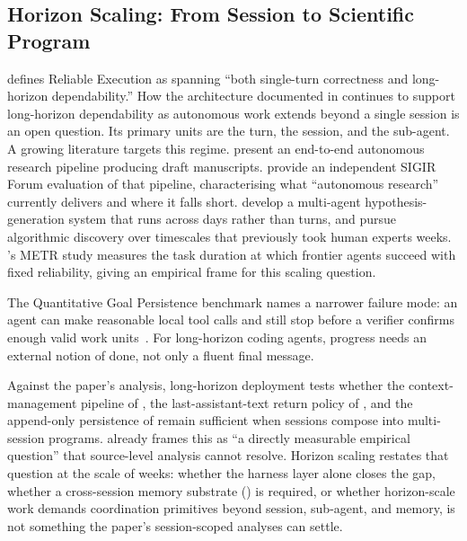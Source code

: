 \subsection{Horizon Scaling: From Session to Scientific Program}
\label{sec:future:horizon}

 defines Reliable Execution as spanning ``both single-turn correctness and long-horizon dependability.'' How the architecture documented in  continues to support long-horizon dependability as autonomous work extends beyond a single session is an open question. Its primary units are the turn, the session, and the sub-agent. A growing literature targets this regime. \citet{lu2024aiscientist} present an end-to-end autonomous research pipeline producing draft manuscripts. \citet{beel2025evalsakana} provide an independent SIGIR Forum evaluation of that pipeline, characterising what ``autonomous research'' currently delivers and where it falls short. \citet{gottweis2025coscientist} develop a multi-agent hypothesis-generation system that runs across days rather than turns, and \citet{novikov2025alphaevolve} pursue algorithmic discovery over timescales that previously took human experts weeks. \citet{kwa2025metrtimehorizon}'s METR study measures the task duration at which frontier agents succeed with fixed reliability, giving an empirical frame for this scaling question.

The Quantitative Goal Persistence benchmark names a narrower failure mode: an agent can make reasonable local tool calls and still stop before a verifier confirms enough valid work units~\citep{cai2026pushagent}. For long-horizon coding agents, progress needs an external notion of done, not only a fluent final message.

Against the paper's analysis, long-horizon deployment tests whether the context-management pipeline of , the last-assistant-text return policy of , and the append-only persistence of  remain sufficient when sessions compose into multi-session programs.  already frames this as ``a directly measurable empirical question'' that source-level analysis cannot resolve. Horizon scaling restates that question at the scale of weeks: whether the harness layer alone closes the gap, whether a cross-session memory substrate () is required, or whether horizon-scale work demands coordination primitives beyond session, sub-agent, and memory, is not something the paper's session-scoped analyses can settle.

